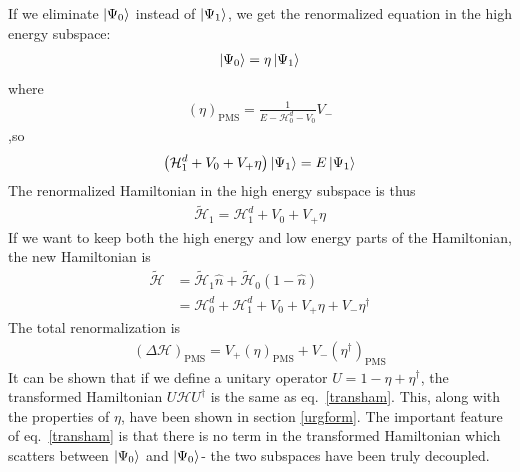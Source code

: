 If we eliminate \(\ket{\Psi_0}\) instead of \(\ket{\Psi_1}\), we get the renormalized equation in the high energy subspace:
\begin{equation}\begin{aligned}
\ket{\Psi_0} = \eta \ket{\Psi_1}
\end{aligned}\end{equation}
where
\begin{equation}\begin{aligned}
	\left(\eta\right)_\text{PMS} = \frac{1}{E - \mathcal{H}^d_0 - V_0}V_-
\end{aligned}\end{equation}
,so
\begin{equation}\begin{aligned}
	\left(\mathcal{H}^d_1 + V_0 + V_+ \eta\right)\ket{\Psi_1} = E\ket{\Psi_1}
\end{aligned}\end{equation}
The renormalized Hamiltonian in the high energy subspace is thus
\begin{equation}\begin{aligned}
	\tilde{\mathcal{H}}_1 = \mathcal{H}^d_1 + V_0 + V_+ \eta
\end{aligned}\end{equation}
If we want to keep both the high energy and low energy parts of the Hamiltonian, the new Hamiltonian is
\begin{equation}\begin{aligned}
	\label{transham}
	\tilde{\mathcal{H}} &= \tilde{\mathcal{H}}_1 \hat n + \tilde{\mathcal{H}}_0 \left(1 - \hat n\right)\\
&= \mathcal{H}^d_0 + \mathcal{H}^d_1 + V_0 + V_+ \eta + V_- \eta^\dagger
\end{aligned}\end{equation}
The total renormalization is
\begin{equation}\begin{aligned}
	\left(\Delta \mathcal{H}\right)_\text{PMS} = V_+ \left(\eta\right)_\text{PMS} + V_- \left(\eta^\dagger\right)_\text{PMS}
\end{aligned}\end{equation}
It can be shown that if we define a unitary operator \(U = 1 - \eta + \eta^\dagger\), the transformed Hamiltonian \(U \mathcal{H} U^\dagger\) is the same as eq.~\ref{transham}. This, along with the properties of \(\eta\), have been shown in section \ref{urgform}. The important feature of eq.~\ref{transham} is that there is no term in the transformed Hamiltonian which scatters between \(\ket{\Psi_0}\) and \(\ket{\Psi_0}\)- the two subspaces have been truly decoupled.
